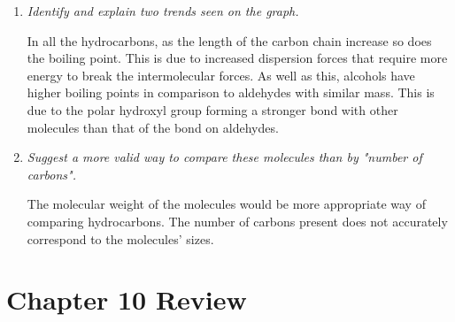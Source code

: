 \documentclass{report}
\begin{document}
\begin{enumerate}
\begin{enumerate}
				\item \textit{Identify and explain two trends seen on the graph.}

					In all the hydrocarbons, as the length of the carbon chain increase so does the boiling point. This is due to increased dispersion forces that require more energy to break the intermolecular forces. As well as this, alcohols have higher boiling points in comparison to aldehydes with similar mass. This is due to the polar hydroxyl group forming a stronger bond with other molecules than that of the  bond on aldehydes.

				\item \textit{Suggest a more valid way to compare these molecules than by "number of carbons".}

					The molecular weight of the molecules would be more appropriate way of comparing hydrocarbons. The number of carbons present does not accurately correspond to the molecules' sizes.
			\end{enumerate}

	\end{enumerate}

\newpage

\section*{Chapter 10 Review}
\end{document}
